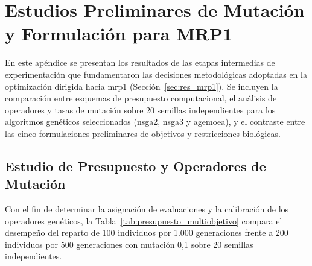 \chapter{Estudios Preliminares de Mutación y Formulación para MRP1}
\label{apendice:estudios_preliminares_mrp1}

En este apéndice se presentan los resultados de las etapas intermedias de experimentación que fundamentaron las decisiones metodológicas adoptadas en la optimización dirigida hacia \gls{mrp1} (Sección~\ref{sec:res_mrp1}). Se incluyen la comparación entre esquemas de presupuesto computacional, el análisis de operadores y tasas de mutación sobre 20 semillas independientes para los algoritmos genéticos seleccionados (\acrshort{nsga2}, \acrshort{nsga3} y \acrshort{agemoea}), y el contraste entre las cinco formulaciones preliminares de objetivos y restricciones biológicas.

\section{Estudio de Presupuesto y Operadores de Mutación}
\label{ap:mutacion}

Con el fin de determinar la asignación de evaluaciones y la calibración de los operadores genéticos, la Tabla~\ref{tab:presupuesto_multiobjetivo} compara el desempeño del reparto de 100 individuos por 1.000 generaciones frente a 200 individuos por 500 generaciones con mutación 0,1 sobre 20 semillas independientes.

